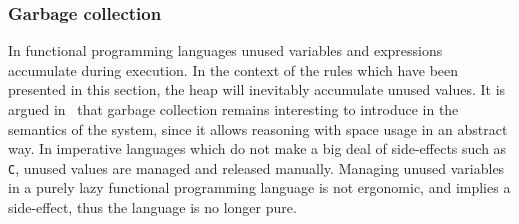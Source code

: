 
\subsubsection{Garbage collection}
In functional programming languages unused variables and expressions accumulate during execution.
In the context of the rules which have been presented in this section, the heap will inevitably accumulate unused values.
It is argued in~\cite{launchbury1993natural} that garbage collection remains interesting to introduce in the semantics of the system, since it allows reasoning with space usage in an abstract way.
In imperative languages which do not make a big deal of side-effects such as \texttt{C}, unused values are managed and released manually.
Managing unused variables in a purely lazy functional programming language is not ergonomic, and implies a side-effect, thus the language is no longer pure.

